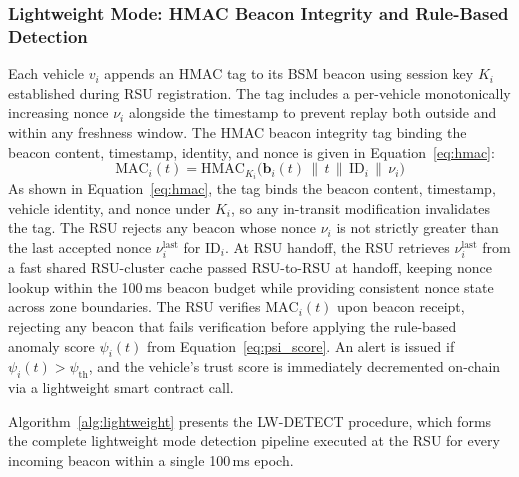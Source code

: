 \documentclass[12pt, a4paper]{report}
\begin{document}
\subsubsection{Lightweight Mode: HMAC Beacon Integrity and Rule-Based Detection}

Each vehicle $v_i$ appends an HMAC tag to its BSM beacon using
session key $K_i$ established during RSU registration. The tag
includes a per-vehicle monotonically increasing nonce $\nu_i$
alongside the timestamp to prevent replay both outside and within
any freshness window. The HMAC beacon integrity tag binding the
beacon content, timestamp, identity, and nonce is given in
Equation~\ref{eq:hmac}:
\begin{equation}
  \mathrm{MAC}_i(t) = \mathrm{HMAC}_{K_i}
  \!\bigl(\mathbf{b}_i(t) \,\|\, t \,\|\,
  \mathrm{ID}_i \,\|\, \nu_i\bigr)
  \label{eq:hmac}
\end{equation}
As shown in Equation~\ref{eq:hmac}, the tag binds the beacon
content, timestamp, vehicle identity, and nonce under $K_i$, so
any in-transit modification invalidates the tag. The RSU rejects
any beacon whose nonce $\nu_i$ is not strictly greater than the
last accepted nonce $\nu_i^{\mathrm{last}}$ for $\mathrm{ID}_i$.
At RSU handoff, the RSU retrieves $\nu_i^{\mathrm{last}}$ from
a fast shared RSU-cluster cache passed RSU-to-RSU at handoff,
keeping nonce lookup within the 100\,ms beacon budget while
providing consistent nonce state across zone boundaries. The RSU verifies $\mathrm{MAC}_i(t)$
upon beacon receipt, rejecting any beacon that fails verification
before applying the rule-based anomaly score $\psi_i(t)$ from
Equation~\ref{eq:psi_score}. An alert is issued if
$\psi_i(t) > \psi_{\mathrm{th}}$, and the vehicle's trust score is
immediately decremented on-chain via a lightweight smart contract call.

Algorithm~\ref{alg:lightweight} presents the LW-DETECT procedure,
which forms the complete lightweight mode detection pipeline executed
at the RSU for every incoming beacon within a single 100\,ms epoch.
\end{document}
